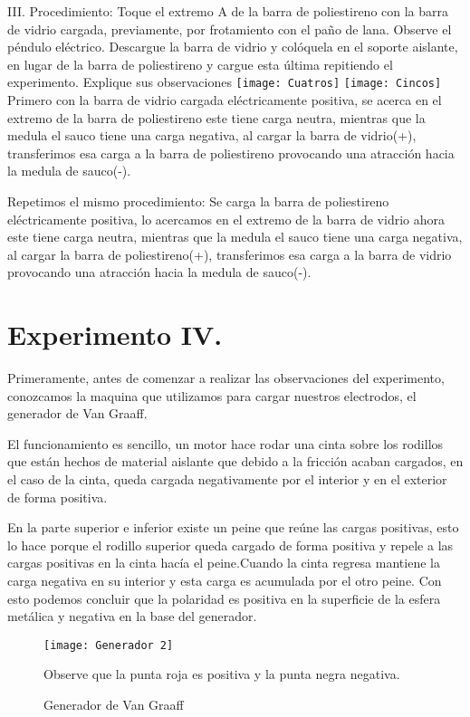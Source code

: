 \documentclass[14pt]{article}
\begin{document}
III. Procedimiento: Toque el extremo A de la barra de poliestireno con la barra de vidrio cargada, previamente, por frotamiento con el paño de lana. Observe el péndulo eléctrico. Descargue la barra de vidrio y colóquela en el soporte aislante, en lugar de la barra de poliestireno y cargue esta última repitiendo el experimento. Explique sus observaciones
\texttt{[image: Cuatros]}
\texttt{[image: Cincos]}
Primero con la barra de vidrio cargada eléctricamente positiva, se acerca en el extremo de la barra de poliestireno este tiene carga neutra, mientras que la medula el sauco tiene una carga negativa, al cargar la barra de vidrio(+), transferimos esa carga a la barra de poliestireno provocando una atracción hacia la medula de sauco(-).

Repetimos el mismo procedimiento:
Se carga la barra de poliestireno eléctricamente positiva, lo acercamos en el extremo de la barra de vidrio ahora este tiene carga neutra, mientras que la medula el sauco tiene una carga negativa, al cargar la barra de poliestireno(+), transferimos esa carga a la barra de vidrio provocando una atracción hacia la medula de sauco(-).
\section{Experimento IV.}

Primeramente, antes de comenzar a realizar las observaciones del experimento, conozcamos la maquina que utilizamos para cargar nuestros electrodos, el generador de Van Graaff.

El funcionamiento es sencillo, un motor hace rodar una cinta sobre los rodillos que están hechos de material aislante que debido a la fricción acaban cargados, en el caso de la cinta, queda cargada negativamente por el interior y en el exterior de forma positiva.

En la parte superior e inferior existe un peine que reúne las cargas positivas, esto lo hace porque el rodillo superior queda cargado de forma positiva y repele a las cargas positivas en la cinta hacía el peine.Cuando la cinta regresa mantiene la carga negativa en su interior y esta carga es acumulada por el otro peine. Con esto podemos concluir que la polaridad es positiva en la superficie de la esfera metálica y negativa en la base del generador.

\begin{figure}[h!]
	\centering
	\texttt{[image: Generador 2]}
	\caption{Generador de Van Graaff}
	\label{fig:Generador}
	Observe que la punta roja es positiva y la punta negra negativa.
\end{figure}
\end{document}
